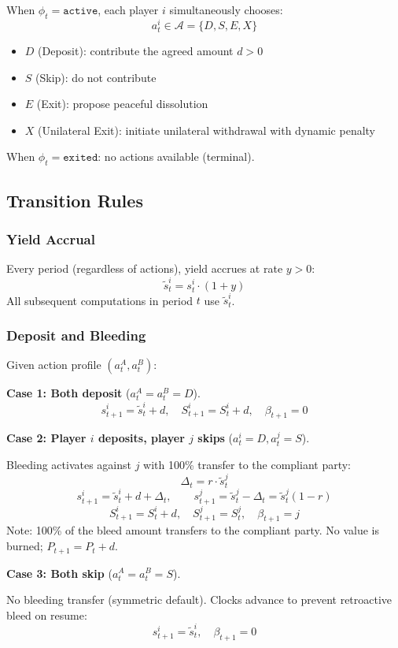 \documentclass[12pt]{article}
\begin{document}
When $\phi_t = \texttt{active}$, each player $i$ simultaneously chooses:
\[
a_t^i \in \mathcal{A} = \{D, S, E, X\}
\]
\begin{itemize}
    \item $D$ (Deposit): contribute the agreed amount $d > 0$
    \item $S$ (Skip): do not contribute
    \item $E$ (Exit): propose peaceful dissolution
    \item $X$ (Unilateral Exit): initiate unilateral withdrawal with dynamic penalty
\end{itemize}

When $\phi_t = \texttt{exited}$: no actions available (terminal).

\subsection{Transition Rules}

\subsubsection{Yield Accrual}
Every period (regardless of actions), yield accrues at rate $y > 0$:
\[
\tilde{s}_t^i = s_t^i \cdot (1 + y)
\]
All subsequent computations in period $t$ use $\tilde{s}_t^i$.

\subsubsection{Deposit and Bleeding}

Given action profile $(a_t^A, a_t^B)$:

\textbf{Case 1: Both deposit} ($a_t^A = a_t^B = D$).
\[
s_{t+1}^i = \tilde{s}_t^i + d, \quad S_{t+1}^i = S_t^i + d, \quad \beta_{t+1} = 0
\]

\textbf{Case 2: Player $i$ deposits, player $j$ skips} ($a_t^i = D, a_t^j = S$).

Bleeding activates against $j$ with 100\% transfer to the compliant party:
\[
\Delta_t = r \cdot \tilde{s}_t^j
\]
\[
s_{t+1}^i = \tilde{s}_t^i + d + \Delta_t, \qquad s_{t+1}^j = \tilde{s}_t^j - \Delta_t = \tilde{s}_t^j(1 - r)
\]
\[
S_{t+1}^i = S_t^i + d, \quad S_{t+1}^j = S_t^j, \quad \beta_{t+1} = j
\]
Note: 100\% of the bleed amount transfers to the compliant party. No value is burned; $P_{t+1} = P_t + d$.

\textbf{Case 3: Both skip} ($a_t^A = a_t^B = S$).

No bleeding transfer (symmetric default). Clocks advance to prevent retroactive bleed on resume:
\[
s_{t+1}^i = \tilde{s}_t^i, \quad \beta_{t+1} = 0
\]
\end{document}
